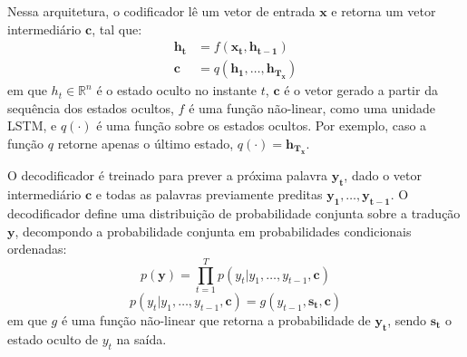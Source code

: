 \begin{figure}
    \centering
      
\end{figure}

Nessa arquitetura, o codificador lê um vetor de entrada $\mathbf{x}$ e retorna
um vetor intermediário $\mathbf{c}$, tal que:   
\begin{align}
    \mathbf{h_t} &= f(\mathbf{x_t}, \mathbf{h_{t-1}}) \\
    \mathbf{c} &= q(\mathbf{h_1}, \ldots, \mathbf{h_{T_x}})
\end{align}
em que $h_t \in \mathbb{R}^n$ é o estado oculto no instante $t$, $\mathbf{c}$ é o vetor
gerado a partir da sequência dos estados ocultos, $f$ é uma função não-linear,
como uma unidade LSTM, e $q(\cdot)$ é uma função sobre os estados ocultos. Por
exemplo, caso a função $q$ retorne apenas o último estado, $q(\cdot) =
\mathbf{h_{T_x}}$.

O decodificador é treinado para prever a próxima palavra $\mathbf{y_t}$, dado o
vetor intermediário $\mathbf{c}$ e todas as palavras previamente preditas
$\mathbf{y_1}, \ldots, \mathbf{y_{t-1}}$. O decodificador define uma
distribuição de probabilidade conjunta sobre a tradução $\mathbf{y}$, decompondo
a probabilidade conjunta em probabilidades condicionais ordenadas:
\begin{equation}
    p(\mathbf{y}) = \prod_{t=1}^T p(y_t | y_1, \ldots, y_{t-1}, \mathbf{c})
\end{equation}
\begin{equation}
    p(y_t | y_1, \ldots, y_{t-1}, \mathbf{c}) = g(y_{t-1}, \mathbf{s_t}, \mathbf{c})
\end{equation}
em que $g$ é uma função não-linear que retorna a probabilidade de
$\mathbf{y_t}$, sendo $\mathbf{s_t}$ o estado oculto de $y_t$ na saída.

